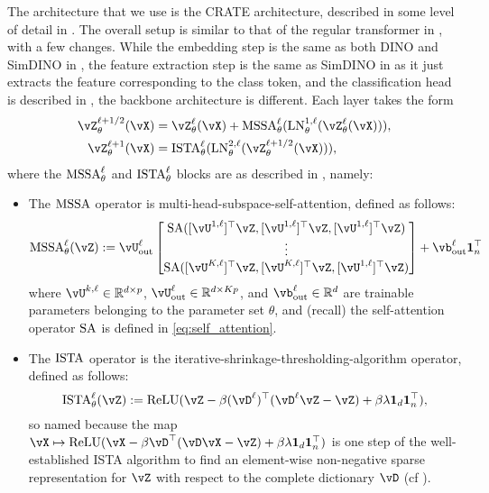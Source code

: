 \documentclass[\toplevelprefix/book-main.tex]{subfiles}
\begin{document}
The architecture that we use is the CRATE architecture, described in some level of detail in . The overall setup is similar to that of the regular transformer in , with a few changes. While the embedding step is the same as both DINO and SimDINO in , the feature extraction step is the same as SimDINO in  as it just extracts the feature corresponding to the class token, and the classification head is described in , the backbone architecture is different. Each layer takes the form
\begin{align}\label{eq:CARTE updates}
    \vZ_{\theta}^{\ell + 1/2}(\vX)
    &= \vZ_{\theta}^{\ell}(\vX) + \MSSA_{\theta}^{\ell}(\LN_{\theta}^{1, \ell}(\vZ_{\theta}^{\ell}(\vX))), \\ 
    \vZ_{\theta}^{\ell + 1}(\vX)
    &= \ISTA_{\theta}^{\ell}(\LN_{\theta}^{2, \ell}(\vZ_{\theta}^{\ell + 1/2}(\vX))),
\end{align}
where the \(\operatorname{MSSA}_{\theta}^{\ell}\) and \(\operatorname{ISTA}_{\theta}^{\ell}\) blocks are as described in , namely:
\begin{itemize}
    \item The \(\operatorname{MSSA}\) operator is multi-head-subspace-self-attention, defined as follows:
    \begin{equation}
        \MSSA_{\theta}^{\ell}(\vZ) := \vU_{\out}^{\ell}\mat{\SA([\vU^{1, \ell}]^{\top}\vZ, [\vU^{1, \ell}]^{\top}\vZ, [\vU^{1, \ell}]^{\top}\vZ)\\ \vdots \\ \SA([\vU^{K, \ell}]^{\top}\vZ, [\vU^{K, \ell}]^{\top}\vZ, [\vU^{1, \ell}]^{\top}\vZ)} + \vb_{\out}^{\ell}\vone_{n}^{\top}
    \end{equation}
    where \(\vU^{k, \ell} \in \R^{d \times p}\), \(\vU_{\out}^{\ell} \in \R^{d \times Kp}\), and \(\vb_{\out}^{\ell} \in \R^{d}\) are trainable parameters belonging to the parameter set \(\theta\), and (recall) the self-attention operator \(\operatorname{SA}\) is defined in \eqref{eq:self_attention}.
    \item The \(\operatorname{ISTA}\) operator is the iterative-shrinkage-thresholding-algorithm operator, defined as follows:
    \begin{equation}
        \ISTA_{\theta}^{\ell}(\vZ) := \ReLU(\vZ - \beta (\vD^{\ell})^{\top}(\vD^{\ell}\vZ - \vZ) + \beta\lambda \vone_{d}\vone_{n}^{\top}),
    \end{equation}
    so named because the map \(\vX \mapsto \ReLU(\vX - \beta \vD^{\top}(\vD\vX - \vZ) + \beta  \lambda \vone_{d}\vone_{n}^{\top})\) is one step of the well-established ISTA algorithm to find an element-wise non-negative sparse representation for \(\vZ\) with respect to the complete dictionary \(\vD\) (cf ).
\end{itemize}
\end{document}

